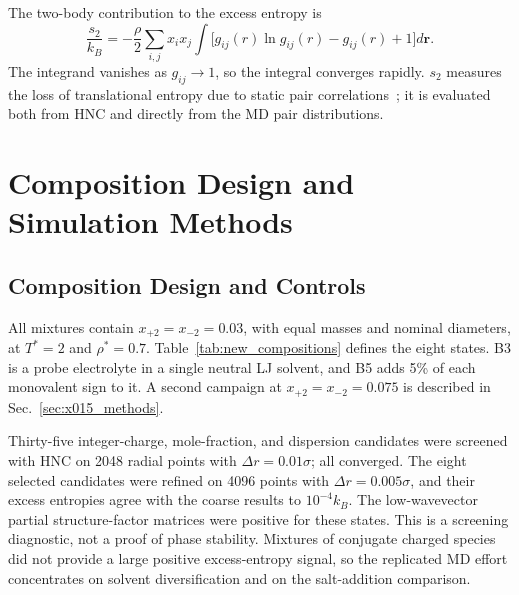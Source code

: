 \documentclass[aps,pre,twocolumn,superscriptaddress,floatfix]{revtex4-2}
\begin{document}
The two-body contribution to the excess entropy is~\cite{Green1952,Wallace1987}
\begin{equation}
\frac{s_2}{k_B} = -\frac{\rho}{2} \sum_{i,j} x_i x_j \int \bigl[ g_{ij}(r) \ln g_{ij}(r) - g_{ij}(r) + 1 \bigr] d\mathbf{r}.
\label{eq:s2_definition}
\end{equation}
The integrand vanishes as $g_{ij}\to1$, so the integral converges rapidly. $s_2$ measures the loss of translational entropy due to static pair correlations~\cite{Wallace1987}; it is evaluated both from HNC and directly from the MD pair distributions.

\section{Composition Design and Simulation Methods}
\label{sec:methods}

\subsection{Composition Design and Controls}

All mixtures contain $x_{+2}=x_{-2}=0.03$, with equal masses and nominal diameters, at $T^*=2$ and $\rho^*=0.7$. Table~\ref{tab:new_compositions} defines the eight states. B3 is a probe electrolyte in a single neutral LJ solvent, and B5 adds 5\% of each monovalent sign to it. A second campaign at $x_{+2}=x_{-2}=0.075$ is described in Sec.~\ref{sec:x015_methods}.



Thirty-five integer-charge, mole-fraction, and dispersion candidates were screened with HNC on 2048 radial points with $\Delta r=0.01\sigma$; all converged. The eight selected candidates were refined on 4096 points with $\Delta r=0.005\sigma$, and their excess entropies agree with the coarse results to $10^{-4}k_B$. The low-wavevector partial structure-factor matrices were positive for these states. This is a screening diagnostic, not a proof of phase stability. Mixtures of conjugate charged species did not provide a large positive excess-entropy signal, so the replicated MD effort concentrates on solvent diversification and on the salt-addition comparison.
\end{document}
